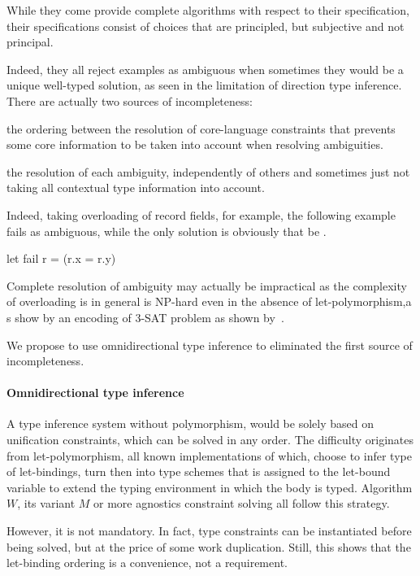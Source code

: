 \documentclass[acmsmall,screen,nonacm]{acmart}
\begin{document}
While they come provide complete algorithms with respect to their
specification, their specifications consist of choices that are principled,
but subjective and not principal.

Indeed, they all reject examples as ambiguous when sometimes they would be a
unique well-typed solution, as seen in the limitation of direction type
inference.  There are actually two sources of incompleteness: 
\begin{enumerate*}
\item
  the ordering between the resolution of core-language constraints that
  prevents some core information to be taken into account when resolving
  ambiguities.
\item 
  the resolution of each ambiguity, independently of others and sometimes
  just not taking all contextual type information into account. 
\end{enumerate*}
Indeed, taking overloading of record fields, for example, the following
example fails as ambiguous, while the only solution is obviously that
 be .
\begin{program}
let fail r = (r.x = r.y)
\end{program}

Complete resolution of ambiguity may actually be impractical as the
complexity of overloading is in general is NP-hard even in the absence of
let-polymorphism,a s show by an encoding of 3-SAT problem as shown by~\citet
{Chargueraud-Bodin-Dunfield-Riboulet/jfla2025}.

We propose to use omnidirectional type inference to eliminated the first
source of incompleteness.

\paragraph{Omnidirectional type inference}

A type inference system without polymorphism, would be solely based on
unification constraints, which can be solved in any order.  The difficulty
originates from \ML let-polymorphism, all known implementations of which,
choose to infer type of let-bindings, turn then into type schemes that is
assigned to the let-bound variable to extend the typing environment in which
the body is typed. Algorithm $W$, its variant $M$ or more agnostics
constraint solving all follow this strategy.

However, it is not mandatory. In fact, type constraints can be instantiated
before being solved, but at the price of some work duplication.  Still,
this shows that the let-binding ordering is a convenience, not a
requirement.
\end{document}
